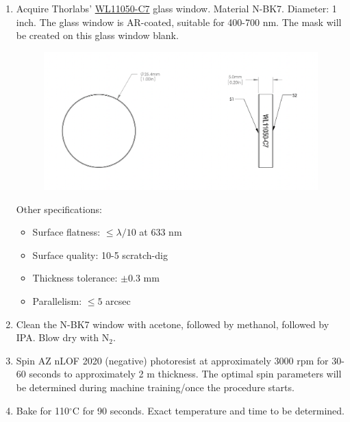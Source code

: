 \documentclass{article}
\theoremstyle{definition}
\begin{document}
\begin{enumerate}[label=(\alph*)]

\item Acquire Thorlabs' \href{https://www.thorlabs.com/thorproduct.cfm?partnumber=WL11050-C7}{WL11050-C7} glass window. Material N-BK7. Diameter: 1 inch. The glass window is AR-coated, suitable for 400-700 nm. The mask will be created on this glass window blank. 



\begin{figure}[!htb]
\centering
\includegraphics[scale=0.6]{thorlabs_window.png}
\end{figure}

Other specifications:
\begin{itemize}
\item Surface flatness: $\leq \lambda/10$ at 633 nm

\item Surface quality: 10-5 scratch-dig

\item Thickness tolerance: $\pm 0.3$ mm 

\item Parallelism: $\leq 5$ arcsec
\end{itemize}


\item Clean the N-BK7 window with acetone, followed by methanol, followed by IPA. Blow dry with N$_2$.

\item Spin AZ nLOF 2020 (negative) photoresist at approximately 3000 rpm for 30-60 seconds to approximately 2 \textmu m thickness. The optimal spin parameters will be determined during machine training/once the procedure starts.

\item Bake for 110$^\circ$C for 90 seconds. Exact temperature and time to be determined. 


\end{enumerate}
\end{document}
